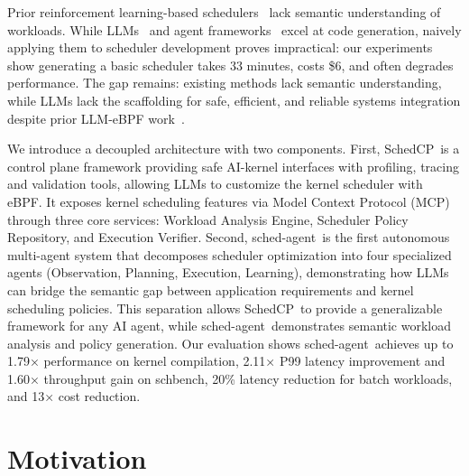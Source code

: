 \documentclass[preprint]{article}
\newcommand{\sys}{SchedCP\xspace}
\newcommand{\agent}{sched-agent\xspace}
\begin{document}
Prior reinforcement learning-based schedulers~\cite{mao2019decima,qiu2020firm} lack semantic understanding of workloads. While LLMs~\cite{openai2023gpt4,anthropic2024claude} and agent frameworks~\cite{autogen,geminicli,claudecode,qian2024chatdev,hong2023metagpt} excel at code generation, naively applying them to scheduler development proves impractical: our experiments show generating a basic scheduler takes 33 minutes, costs \$6, and often degrades performance. The gap remains: existing methods lack semantic understanding, while LLMs lack the scaffolding for safe, efficient, and reliable systems integration despite prior LLM-eBPF work~\cite{kgent}.

We introduce a decoupled architecture with two components. First, \sys\ is a control plane framework providing safe AI-kernel interfaces with profiling, tracing and validation tools, allowing LLMs to customize the kernel scheduler with eBPF. It exposes kernel scheduling features via Model Context Protocol (MCP) through three core services: Workload Analysis Engine, Scheduler Policy Repository, and Execution Verifier. Second, \agent\ is the first autonomous multi-agent system that decomposes scheduler optimization into four specialized agents (Observation, Planning, Execution, Learning), demonstrating how LLMs can bridge the semantic gap between application requirements and kernel scheduling policies. This separation allows \sys\ to provide a generalizable framework for any AI agent, while \agent\ demonstrates semantic workload analysis and policy generation. Our evaluation shows \agent\ achieves up to 1.79× performance on kernel compilation, 2.11× P99 latency improvement and 1.60× throughput gain on schbench, 20\% latency reduction for batch workloads, and 13× cost reduction.

\section{Motivation}
\label{sec:motivation}
\end{document}
